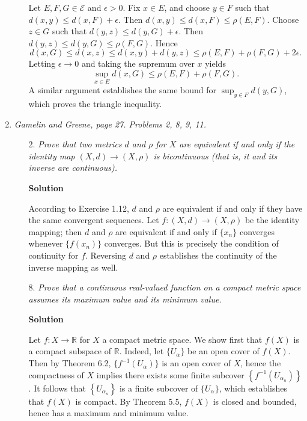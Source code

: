 \documentclass{article}
\begin{document}
\begin{enumerate}
\begin{itemize}
Let \(E,F,G \in \mathcal{E}\) and \(\epsilon > 0\).  Fix \(x \in E\), and choose \(y \in F\) such that \(d(x,y) \leq d(x,F) + \epsilon\).  Then \(d(x,y) \leq d(x,F) \leq \rho(E,F)\).  Choose \(z \in G\) such that \(d(y,z) \leq d(y,G) + \epsilon\).  Then \(d(y,z) \leq d(y,G) \leq \rho(F,G)\).  Hence
\[d(x,G) \leq d(x,z) \leq d(x,y) + d(y,z) \leq \rho(E,F) + \rho(F,G) + 2\epsilon.\]
Letting \(\epsilon \to 0\) and taking the supremum over \(x\) yields
\[\sup_{x \in E} d(x,G) \leq \rho(E,F) + \rho(F,G).\]
A similar argument establishes the same bound for \(\sup_{y \in F} d(y,G)\), which proves the triangle inequality.



\end{itemize}

\item {\em Gamelin and Greene, page 27.  Problems 2, 8, 9, 11.}

\begin{itemize}

\item[2.] {\em Prove that two metrics \(d\) and \(\rho\) for \(X\) are equivalent if and only if the identity map \((X,d) \to (X,\rho)\) is bicontinuous (that is, it and its inverse are continuous).}

{\bf Solution}

According to Exercise 1.12, \(d\) and \(\rho\) are equivalent if and only if they have the same convergent sequences.  Let \(f:(X,d) \to (X,\rho)\) be the identity mapping; then \(d\) and \(\rho\) are equivalent if and only if \(\{x_n\}\) converges whenever \(\{f(x_n)\}\) converges.  But this is precisely the condition of continuity for \(f\).  Reversing \(d\) and \(\rho\) establishes the continuity of the inverse mapping as well.



\item[8.] {\em Prove that a continuous real-valued function on a compact metric space assumes its maximum value and its minimum value.}

{\bf Solution}

Let \(f:X \to \mathbb{R}\) for \(X\) a compact metric space.  We show first that \(f(X)\) is a compact subspace of \(\mathbb{R}\).  Indeed, let \(\{U_{\alpha}\}\) be an open cover of \(f(X)\).  Then by Theorem 6.2, \(\{f^{-1}(U_{\alpha})\}\) is an open cover of \(X\), hence the compactness of \(X\) implies there exists some finite subcover \(\left\{ f^{-1} \left( U_{\alpha_n} \right) \right\}\).  It follows that \(\left\{ U_{\alpha_n} \right\}\) is a finite subcover of \(\{U_{\alpha}\}\), which establishes that \(f(X)\) is compact.  By Theorem 5.5, \(f(X)\) is closed and bounded, hence has a maximum and minimum value.




\end{itemize}
\end{enumerate}
\end{document}
